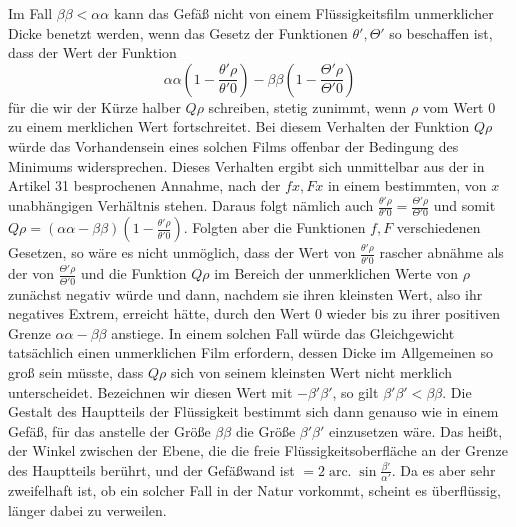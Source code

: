 Im Fall $\beta\beta<\alpha\alpha$ kann das Gefäß nicht von einem Flüssigkeitsfilm unmerklicher Dicke benetzt werden, wenn das Gesetz der Funktionen $\theta',\Theta'$ so beschaffen ist, dass der Wert der Funktion
\[
\alpha\alpha\left(1-\frac{\theta'\rho}{\theta'0}\right)-\beta\beta\left(1-\frac{\Theta'\rho}{\Theta'0}\right)
\]
für die wir der Kürze halber $Q\rho$ schreiben, stetig zunimmt, wenn $\rho$ vom Wert $0$ zu einem merklichen Wert fortschreitet. Bei diesem Verhalten der Funktion $Q\rho$ würde das Vorhandensein eines solchen Films offenbar der Bedingung des Minimums widersprechen. Dieses Verhalten ergibt sich unmittelbar aus der in Artikel 31 besprochenen Annahme, nach der $fx,Fx$ in einem bestimmten, von $x$ unabhängigen Verhältnis stehen. Daraus folgt nämlich auch $\frac{\theta'\rho}{\theta'0}=\frac{\Theta'\rho}{\Theta'0}$ und somit $Q\rho=(\alpha\alpha-\beta\beta)(1-\frac{\theta'\rho}{\theta'0})$. Folgten aber die Funktionen $f,F$ verschiedenen Gesetzen, so wäre es nicht unmöglich, dass der Wert von $\frac{\theta'\rho}{\theta'0}$ rascher abnähme als der von $\frac{\Theta'\rho}{\Theta'0}$ und die Funktion $Q\rho$ im Bereich der unmerklichen Werte von $\rho$ zunächst negativ würde und dann, nachdem sie ihren kleinsten Wert, also ihr negatives Extrem, erreicht hätte, durch den Wert $0$ wieder bis zu ihrer positiven Grenze $\alpha\alpha-\beta\beta$ anstiege. In einem solchen Fall würde das Gleichgewicht tatsächlich einen unmerklichen Film erfordern, dessen Dicke im Allgemeinen so groß sein müsste, dass $Q\rho$ sich von seinem kleinsten Wert nicht merklich unterscheidet. Bezeichnen wir diesen Wert mit $-\beta'\beta'$, so gilt $\beta'\beta'<\beta\beta$. Die Gestalt des Hauptteils der Flüssigkeit bestimmt sich dann genauso wie in einem Gefäß, für das anstelle der Größe $\beta\beta$ die Größe $\beta'\beta'$ einzusetzen wäre. Das heißt, der Winkel zwischen der Ebene,
die die freie Flüssigkeitsoberfläche an der Grenze des Hauptteils berührt, und der Gefäßwand ist $=2\operatorname{arc.}\sin\frac{\beta'}{\alpha'}$. Da es aber sehr zweifelhaft ist, ob ein solcher Fall in der Natur vorkommt, scheint es überflüssig, länger dabei zu verweilen.

